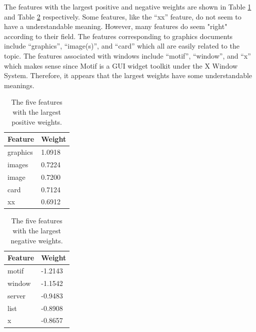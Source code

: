 \documentclass[a4paper,11pt]{article}
\begin{document}
The features with the largest positive and negative weights are shown in 
Table \ref{tables:WU4Pos} and Table \ref{tables:WU4Neg} respectively. 
Some features, like the ``xx'' feature, do not seem to have a understandable 
meaning. However, many features do seem "right" according to their field.
The features corresponding to graphics documents include ``graphics'', 
``image(s)'', and ``card'' which all are easily related to the topic. 
The features associated with windows include ``motif'', ``window'', and ``x''
which makes sense since Motif is a GUI widget toolkit under the X Window System. 
Therefore, it appears that the largest weights have some understandable meanings.

\begin{table}[!ht]
\begin{center}
    \caption{The five features with the largest positive weights.}
    \begin{tabular}{| l | l |}
    \hline
    Feature  & Weight \\ \hline
    graphics & 1.0918 \\ \hline %
    images   & 0.7224 \\ \hline %
    image    & 0.7200 \\ \hline %
    card     & 0.7124 \\ \hline %
    xx       & 0.6912 \\ \hline %
    \end{tabular}
    \label{tables:WU4Pos}
\end{center}
\end{table}

\begin{table}[!ht]
\begin{center}
    \caption{The five features with the largest negative weights.}
    \begin{tabular}{| l | l |}
    \hline
    Feature &  Weight \\ \hline
    motif   & -1.2143 \\ \hline %
    window  & -1.1542 \\ \hline %
    server  & -0.9483 \\ \hline %
    list    & -0.8908 \\ \hline %
    x       & -0.8657 \\ \hline %
    \end{tabular}
    \label{tables:WU4Neg}
\end{center}
\end{table}
\end{document}
